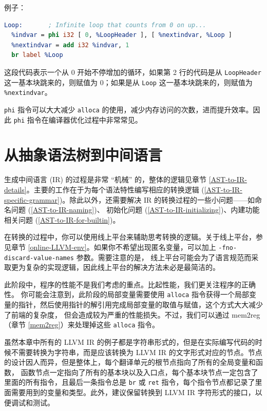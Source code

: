 例子：
\begin{lstlisting}[language=llvm]
Loop:       ; Infinite loop that counts from 0 on up...
  %indvar = phi i32 [ 0, %LoopHeader ], [ %nextindvar, %Loop ]
  %nextindvar = add i32 %indvar, 1
  br label %Loop
\end{lstlisting}

这段代码表示一个从 0 开始不停增加的循环，如果第 2 行的代码是从 \texttt{LoopHeader}
这一基本块跳来的，则赋值为 0；如果是从 \texttt{Loop} 这一基本块跳来的，则赋值为
\texttt{\%nextindvar}。

\texttt{phi} 指令可以大大减少 \texttt{alloca} 的使用，减少内存访问的次数，进而提升效率。因此
\texttt{phi} 指令在编译器优化过程中非常常见。

\section{从抽象语法树到中间语言}\label{AST-to-IR}

生成中间语言 (IR) 的过程是非常 “机械” 的，整体的逻辑见章节
\ref{AST-to-IR-details}。主要的工作在于为每个语法特性编写相应的转换逻辑
(\ref{AST-to-IR-specific-grammar})。除此以外，还需要解决
IR 的转换过程的一些小问题——如命名问题 (\ref{AST-to-IR-naming})、
初始化问题 (\ref{AST-to-IR-initializing})、内建功能相关问题
(\ref{AST-to-IR-for-builtin})。

在转换的过程中，你可以使用线上平台来辅助思考转换的逻辑。关于线上平台，参见章节
\ref{online-LLVM-env}。如果你不希望出现匿名变量，可以加上
\texttt{-fno-discard-value-names} 参数。需要注意的是，
线上平台可能会为了语言规范而采取更为复杂的实现逻辑，因此线上平台的解决方法未必是最简洁的。

此阶段中，程序的性能不是我们考虑的重点。比起性能，我们更关注程序的正确性。
你可能会注意到，此阶段的局部变量需要使用 \texttt{alloca}
指令获得一个局部变量的指针，然后使用指针的解引用完成局部变量的取值与赋值，这个方式大大减少了前端的复杂度，
但会造成较为严重的性能损失。不过，我们可以通过 mem2reg（章节 \ref{mem2reg}）来处理掉这些
\texttt{alloca} 指令。

虽然本章中所有的 LLVM IR 的例子都是字符串形式的，但是在实际编写代码的时候不需要转换为字符串，而是应该转换为
LLVM IR 的文字形式对应的节点。节点的设计因人而异，但是整体上，每个翻译单元的根节点指向了所有的全局变量和函数，
函数节点一定指向了所有的基本块以及入口点，每个基本块节点一定包含了里面的所有指令，且最后一条指令总是
\texttt{br} 或 \texttt{ret} 指令，每个指令节点都记录了里面需要用到的变量和类型。此外，建议保留转换到
LLVM IR 字符形式的接口，以便调试和测试。

